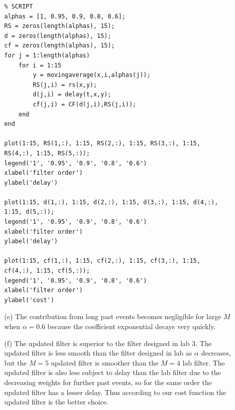 \documentclass{article}
\begin{document}
\begin{enumerate}
\begin{enumerate}
\begin{lstlisting}
% SCRIPT
alphas = [1, 0.95, 0.9, 0.8, 0.6];
RS = zeros(length(alphas), 15);
d = zeros(length(alphas), 15);
cf = zeros(length(alphas), 15);
for j = 1:length(alphas)
    for i = 1:15
        y = movingaverage(x,i,alphas(j));
        RS(j,i) = rs(x,y);
        d(j,i) = delay(t,x,y);
        cf(j,i) = CF(d(j,i),RS(j,i));
    end
end

plot(1:15, RS(1,:), 1:15, RS(2,:), 1:15, RS(3,:), 1:15, RS(4,:), 1:15, RS(5,:));
legend('1', '0.95', '0.9', '0.8', '0.6')
xlabel('filter order')
ylabel('delay')

plot(1:15, d(1,:), 1:15, d(2,:), 1:15, d(3,:), 1:15, d(4,:), 1:15, d(5,:));
legend('1', '0.95', '0.9', '0.8', '0.6')
xlabel('filter order')
ylabel('delay')

plot(1:15, cf(1,:), 1:15, cf(2,:), 1:15, cf(3,:), 1:15, cf(4,:), 1:15, cf(5,:));
legend('1', '0.95', '0.9', '0.8', '0.6')
xlabel('filter order')
ylabel('cost')
\end{lstlisting}

\bigskip

	\item[(e)]
		The contribution from long past events becomes negligible for large $M$ when $\alpha=0.6$ because the coefficient exponential decays very quickly.

\bigskip

	\item[(f)]
		The updated filter is superior to the filter designed in lab 3. The updated filter is less smooth than the filter designed in lab as $\alpha$ decreases, but the $M=5$ updated filter is smoother than the $M=4$ lab filter. The updated filter is also less subject to delay than the lab filter due to the decreasing weights for further past events, so for the same order the updated filter has a lesser delay. Thus according to our cost function the updated filter is the better choice.

	\end{enumerate}

\newpage


\end{enumerate}
\end{document}

